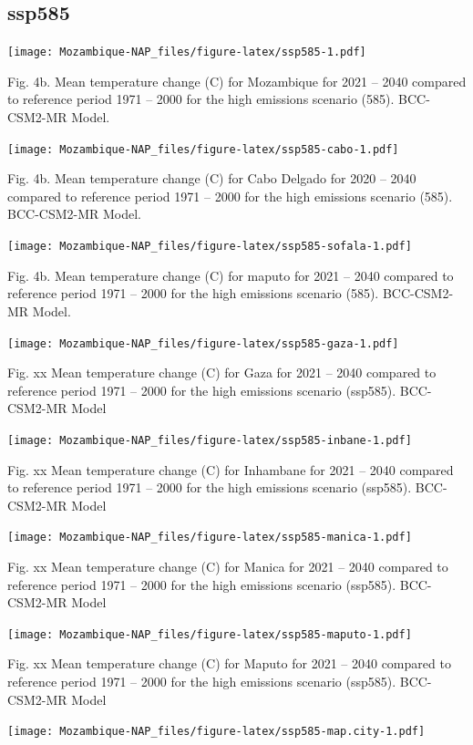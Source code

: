 \documentclass[
]{book}
\begin{document}
\hypertarget{ssp585}{%
\subsection{ssp585}\label{ssp585}}

\texttt{[image: Mozambique-NAP\_files/figure-latex/ssp585-1.pdf]}

Fig. 4b. Mean temperature change (C) for Mozambique for 2021 -- 2040 compared to reference period 1971 -- 2000 for the high emissions scenario (585). BCC-CSM2-MR Model.

\texttt{[image: Mozambique-NAP\_files/figure-latex/ssp585-cabo-1.pdf]}

Fig. 4b. Mean temperature change (C) for Cabo Delgado for 2020 -- 2040 compared to reference period 1971 -- 2000 for the high emissions scenario (585). BCC-CSM2-MR Model.

\texttt{[image: Mozambique-NAP\_files/figure-latex/ssp585-sofala-1.pdf]}

Fig. 4b. Mean temperature change (C) for maputo for 2021 -- 2040 compared to reference period 1971 -- 2000 for the high emissions scenario (585). BCC-CSM2-MR Model.

\texttt{[image: Mozambique-NAP\_files/figure-latex/ssp585-gaza-1.pdf]}

Fig. xx Mean temperature change (C) for Gaza for 2021 -- 2040 compared to reference period 1971 -- 2000 for the high emissions scenario (ssp585). BCC-CSM2-MR Model

\texttt{[image: Mozambique-NAP\_files/figure-latex/ssp585-inbane-1.pdf]}

Fig. xx Mean temperature change (C) for Inhambane for 2021 -- 2040 compared to reference period 1971 -- 2000 for the high emissions scenario (ssp585). BCC-CSM2-MR Model

\texttt{[image: Mozambique-NAP\_files/figure-latex/ssp585-manica-1.pdf]}

Fig. xx Mean temperature change (C) for Manica for 2021 -- 2040 compared to reference period 1971 -- 2000 for the high emissions scenario (ssp585). BCC-CSM2-MR Model

\texttt{[image: Mozambique-NAP\_files/figure-latex/ssp585-maputo-1.pdf]}

Fig. xx Mean temperature change (C) for Maputo for 2021 -- 2040 compared to reference period 1971 -- 2000 for the high emissions scenario (ssp585). BCC-CSM2-MR Model

\texttt{[image: Mozambique-NAP\_files/figure-latex/ssp585-map.city-1.pdf]}
\end{document}
